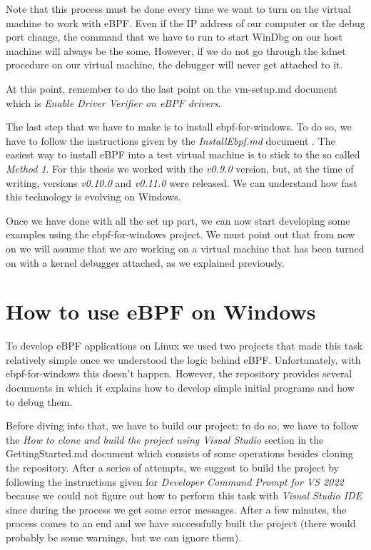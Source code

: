 Note that this process must be done every time we want to turn on the virtual machine to work with eBPF.
Even if the IP address of our computer or the debug port change, the command that we have to run to start WinDbg on our host machine will always be the some.
However, if we do not go through the kdnet procedure on our virtual machine, the debugger will never get attached to it.

At this point, remember to do the last point on the vm-setup.md document which is \textit{Enable Driver Verifier on eBPF drivers}.

The last step that we have to make is to install ebpf-for-windows.
To do so, we have to follow the instructions given by the \textit{InstallEbpf.md} document \cite{InseBPFDoc}.
The easiest way to install eBPF into a test virtual machine is to stick to the so called \textit{Method 1}.
For this thesis we worked with the \textit{v0.9.0} version, but, at the time of writing, versions \textit{v0.10.0} and \textit{v0.11.0} were released.
We can understand how fast this technology is evolving on Windows.

Once we have done with all the set up part, we can now start developing some examples using the ebpf-for-windows project.
We must point out that from now on we will assume that we are working on a virtual machine that has been turned on with a kernel debugger attached, as we explained previously.

\section{How to use eBPF on Windows}

To develop eBPF applications on Linux we used two projects that made this task relatively simple once we understood the logic behind eBPF.
Unfortunately, with ebpf-for-windows this doesn't happen.
However, the repository provides several documents in which it explains how to develop simple initial programs and how to debug them.

Before diving into that, we have to build our project: to do so, we have to follow the \textit{How to clone and build the project using Visual Studio} section in the GettingStarted.md document which consists of some operations besides cloning the repository.
After a series of attempts, we suggest to build the project by following the instructions given for \textit{Developer Command Prompt for VS 2022} because we could not figure out how to perform this task with \textit{Visual Studio IDE} since during the process we get some error messages.
After a few minutes, the process comes to an end and we have successfully built the project (there would probably be some warnings, but we can ignore them).

